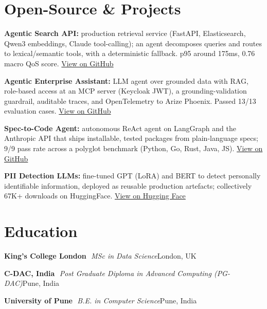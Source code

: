 \documentclass[10pt,a4paper]{article}
\newcommand{\sep}{\,\textcolor{accent!60}{\textbar}\,}
\begin{document}
\section{Open-Source \& Projects}
\begin{tight}
  \item \textbf{Agentic Search API:} production retrieval service (FastAPI, Elasticsearch, Qwen3 embeddings, Claude tool-calling); an agent decomposes queries and routes to lexical/semantic tools, with a deterministic fallback. p95 around 175ms, 0.76 macro QoS score. \href{https://github.com/abhijeetscode/search-agent}{View on GitHub}
  \item \textbf{Agentic Enterprise Assistant:} LLM agent over grounded data with RAG, role-based access at an MCP server (Keycloak JWT), a grounding-validation guardrail, auditable traces, and OpenTelemetry to Arize Phoenix. Passed 13/13 evaluation cases. \href{https://github.com/abhijeetscode/Agentic-Enterprise-Assistant}{View on GitHub}
  \item \textbf{Spec-to-Code Agent:} autonomous ReAct agent on LangGraph and the Anthropic API that ships installable, tested packages from plain-language specs; 9/9 pass rate across a polyglot benchmark (Python, Go, Rust, Java, JS). \href{https://github.com/abhijeetscode/Spec-to-Code-Agent}{View on GitHub}
  \item \textbf{PII Detection LLMs:} fine-tuned GPT (LoRA) and BERT to detect personally identifiable information, deployed as reusable production artefacts; collectively 67K+ downloads on HuggingFace. \href{https://huggingface.co/ab-ai/pii_model}{View on Hugging Face}
\end{tight}

\section{Education}
{\color{company}\bfseries King's College London} \sep {\itshape MSc in Data Science}\hfill {\color{muted}London, UK}\par\vspace{1pt}
{\color{company}\bfseries C-DAC, India} \sep {\itshape Post Graduate Diploma in Advanced Computing (PG-DAC)}\hfill {\color{muted}Pune, India}\par\vspace{1pt}
{\color{company}\bfseries University of Pune} \sep {\itshape B.E. in Computer Science}\hfill {\color{muted}Pune, India}\par
\end{document}
